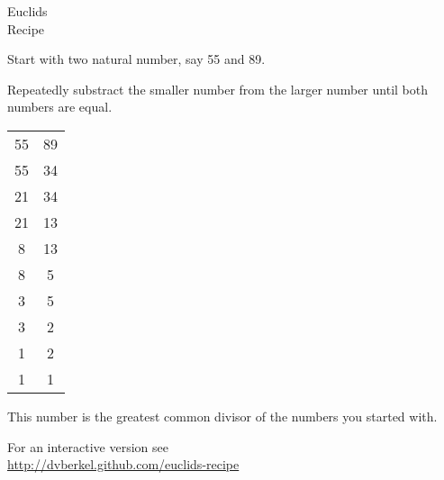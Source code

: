 \documentclass[a4paper]{article}
\begin{document}
\vspace*{\fill}

\begin{center}
  \Huge
  Euclids\\
  Recipe
\end{center}

Start with two natural number, say 55 and 89.

Repeatedly substract the smaller number from the larger number until
both numbers are equal.

\begin{center}
  \begin{tabular}{cc}
    55 & 89 \\
    55 & 34 \\
    21 & 34 \\
    21 & 13 \\
    8 & 13 \\
    8 &  5 \\
    3 &  5 \\
    3 &  2 \\
    1 &  2 \\
    1 &  1 \\
  \end{tabular}
\end{center}

This number is the greatest common divisor of the numbers you started with.

For an interactive version see\\
{\scriptsize\url{http://dvberkel.github.com/euclids-recipe}}

\vspace{\fill}
\end{document}
